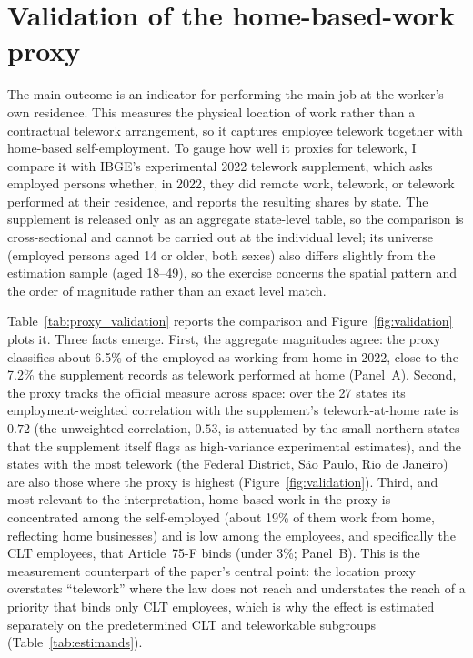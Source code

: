 \clearpage
\section{Validation of the home-based-work proxy}\label{app:validation}

The main outcome is an indicator for performing the main job at the worker's own residence. This measures the physical location of work rather than a contractual telework arrangement, so it captures employee telework together with home-based self-employment. To gauge how well it proxies for telework, I compare it with IBGE's experimental 2022 telework supplement, which asks employed persons whether, in 2022, they did remote work, telework, or telework performed at their residence, and reports the resulting shares by state. The supplement is released only as an aggregate state-level table, so the comparison is cross-sectional and cannot be carried out at the individual level; its universe (employed persons aged 14 or older, both sexes) also differs slightly from the estimation sample (aged 18--49), so the exercise concerns the spatial pattern and the order of magnitude rather than an exact level match.

Table~\ref{tab:proxy_validation} reports the comparison and Figure~\ref{fig:validation} plots it. Three facts emerge. First, the aggregate magnitudes agree: the proxy classifies about 6.5\% of the employed as working from home in 2022, close to the 7.2\% the supplement records as telework performed at home (Panel~A). Second, the proxy tracks the official measure across space: over the 27 states its employment-weighted correlation with the supplement's telework-at-home rate is $0.72$ (the unweighted correlation, $0.53$, is attenuated by the small northern states that the supplement itself flags as high-variance experimental estimates), and the states with the most telework (the Federal District, S\~ao Paulo, Rio de Janeiro) are also those where the proxy is highest (Figure~\ref{fig:validation}). Third, and most relevant to the interpretation, home-based work in the proxy is concentrated among the self-employed (about 19\% of them work from home, reflecting home businesses) and is low among the employees, and specifically the CLT employees, that Article~75-F binds (under 3\%; Panel~B). This is the measurement counterpart of the paper's central point: the location proxy overstates ``telework'' where the law does not reach and understates the reach of a priority that binds only CLT employees, which is why the effect is estimated separately on the predetermined CLT and teleworkable subgroups (Table~\ref{tab:estimands}).

